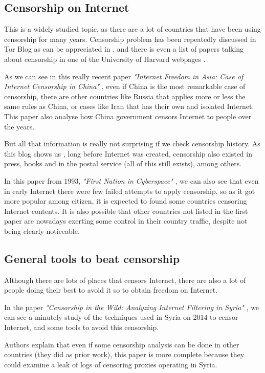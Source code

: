 \subsection{Censorship on Internet}
\label{ssec:censorshipInternet}
This is a widely studied topic, as there are a lot of countries that have been using censorship for many years. Censorship problem has been repeatedly discussed in Tor Blog as can be appreciated in \cite{TorBlog}, and there is even a list of papers talking about censorship in one of the University of Harvard webpages \cite{HarvardCensor}.

As we can see in this really recent paper \emph{"Internet Freedom in Asia: Case of Internet Censorship in China"} \cite{ChinaPaper}, even if China is the most remarkable case of censorship, there are other countries like Russia that applies more or less the same rules as China, or cases like Iran that has their own and isolated Internet. This paper also analyse how China government censors Internet to people over the years.

But all that information is really not surprising if we check censorship history. As this blog shows us \cite{HistoryCensor}, long before Internet was created, censorship also existed in press, books and in the postal service (all of this still exists), among others. 

In this paper from 1993, \emph{"First Nation in Cyberspace"} \cite{FirstInternet}, we can also see that even in early Internet there were few failed attempts to apply censorship, so as it got more popular among citizen, it is expected to found some countries censoring Internet contents. It is also possible that other countries not listed in the first paper are nowadays exerting some control in their country traffic, despite not being clearly noticeable.

\subsection{General tools to beat censorship}
\label{ssec:toolsBeatCensor}
Although there are lots of places that censors Internet, there are also a lot of people doing their best to avoid it so to obtain freedom on Internet. 

In the paper \emph{"Censorship in the Wild: Analyzing Internet Filtering in Syria"} \cite{SyriaPaper}, we can see a minutely study of the techniques used in Syria on 2014 to censor Internet, and some tools to avoid this censorship. 

\pagebreak
Authors explain that even if some censorship analysis can be done in other countries (they did as prior work), this paper is more complete because they could examine a leak of logs of censoring proxies operating in Syria.
 
